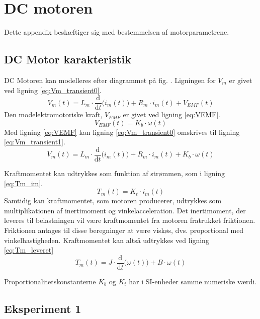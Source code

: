 \section{DC motoren}
Dette appendix beskæftiger sig med bestemmelsen af motorparametrene.
\subsection{DC Motor karakteristik}
DC Motoren kan modelleres efter diagrammet på fig. .
Ligningen for \(V_m\) er givet ved ligning \ref{eq:Vm_transient0}.
\begin{equation}
	V_m(t)=L_m \cdot \frac{\mathrm d}{\mathrm d t} \big( i_m(t) \big)+R_m \cdot i_m(t) + V_{EMF}(t)
	\label{eq:Vm_transient0} 
 \end{equation}
Den modelektromotoriske kraft, \(V_{EMF}\) er givet ved ligning \ref{eq:VEMF}.
\begin{equation}
	V_{EMF}(t) = K_b \cdot \omega(t)
	\label{eq:VEMF}
\end{equation}
Med ligning \ref{eq:VEMF} kan ligning \ref{eq:Vm_transient0} omskrives til ligning \ref{eq:Vm_transient1}.
\begin{equation}
	V_m(t)=L_m \cdot \frac{\mathrm d}{\mathrm d t} \big( i_m(t) \big)+R_m \cdot i_m(t) +K_b \cdot \omega(t)
	\label{eq:Vm_transient1} 
 \end{equation}

Kraftmomentet kan udtrykkes som funktion af strømmen, som i ligning \ref{eq:Tm_im}.
\begin{equation}
	T_m(t)=K_t\cdot{i_m(t)}
	\label{eq:Tm_im} 
 \end{equation}
Samtidig kan kraftmomentet, som motoren producerer, udtrykkes som multiplikationen af inertimoment og vinkelacceleration.
Det inertimoment, der leveres til belastningen vil være kraftmomentet fra motoren fratrukket friktionen.
Friktionen antages til disse beregninger at være viskøs, dvs. proportional med vinkelhastigheden.
Kraftmomentet kan altså udtrykkes ved ligning \ref{eq:Tm_leveret}
\begin{equation}
	T_m(t)=J\cdot\frac{\mathrm d}{\mathrm d t} \big(\omega(t) \big)+B\cdot\omega(t)
	\label{eq:Tm_leveret} 
 \end{equation}

Proportionalitetskonstanterne \(K_b\) og \(K_t\) har i SI-enheder samme numeriske værdi.

\subsection{Eksperiment 1}
\label{ss:eksperiment1}
